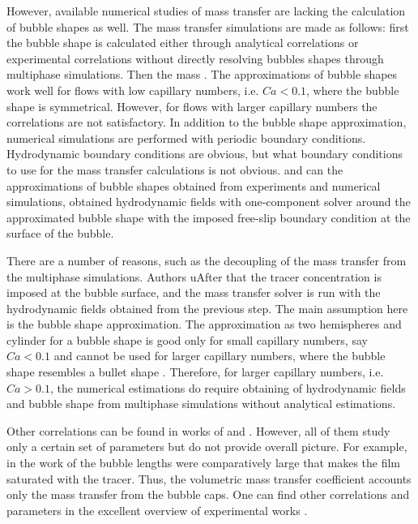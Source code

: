 \documentclass{article}
\begin{document}
However, available numerical studies of mass transfer \cite{kreutzer-overview,vanbaten-circular} are lacking the calculation of  bubble shapes as well. The mass transfer simulations are made as follows: first the bubble shape is calculated either through analytical correlations \cite{bretherton} or experimental correlations \cite{cerro-bubble-train} without directly resolving bubbles shapes through multiphase simulations. Then the mass .  The approximations of bubble shapes work well for flows with low capillary numbers, i.e. $Ca<0.1$, where the bubble shape is symmetrical. However, for flows with larger capillary numbers the correlations are not satisfactory. In addition to the bubble shape approximation, numerical simulations are performed with periodic boundary conditions. Hydrodynamic boundary conditions are obvious, but what boundary conditions to use for the mass transfer calculations is not obvious.   and can  
the approximations of bubble shapes obtained from experiments and numerical simulations, obtained hydrodynamic fields with 
one-component solver around the approximated bubble shape with the imposed free-slip boundary condition at the surface of the bubble.




There are a number of reasons, such as 
the decoupling of the mass transfer from the multiphase simulations. Authors \cite{kreutzer-overview,vanbaten-circular} uAfter that the tracer concentration is imposed at the bubble surface, and the mass transfer solver is run with the hydrodynamic fields obtained
from the previous step. The main assumption here is the bubble shape approximation. The approximation as two hemispheres and cylinder
\cite{vanbaten-circular} for a bubble shape is good only for small capillary numbers, say $Ca<0.1$ and cannot be used for larger capillary numbers, 
where the bubble shape resembles a bullet shape \cite{kuzmin-binary2d,kuzmin-binary3d}. Therefore, for larger capillary numbers, i.e. $Ca>0.1$, 
the numerical estimations do require obtaining of hydrodynamic fields and bubble shape from multiphase simulations without analytical estimations.





Other correlations can be found in works of \citet{kreutzer-overview}
and \citet{bercic-mass}. However, all of them study only a certain set of parameters but do not provide overall picture. 
For example, in the work of \citet{bercic-mass} the bubble lengths were comparatively large that makes the film saturated
with the tracer. Thus, the volumetric mass transfer coefficient accounts only the mass transfer from the bubble caps. 
One can find other correlations and parameters in  the excellent overview of experimental works \cite{yue-mass}.
\end{document}
